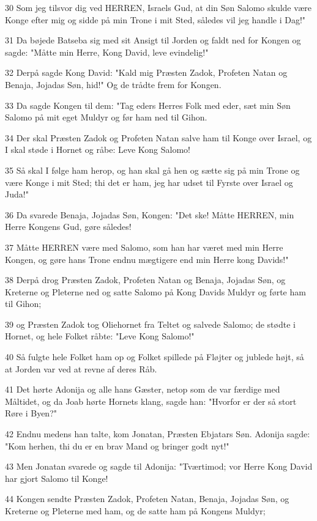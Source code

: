 \par 30 Som jeg tilsvor dig ved HERREN, Israels Gud, at din Søn Salomo skulde være Konge efter mig og sidde på min Trone i mit Sted, således vil jeg handle i Dag!"
\par 31 Da bøjede Batseba sig med sit Ansigt til Jorden og faldt ned for Kongen og sagde: "Måtte min Herre, Kong David, leve evindelig!"
\par 32 Derpå sagde Kong David: "Kald mig Præsten Zadok, Profeten Natan og Benaja, Jojadas Søn, hid!" Og de trådte frem for Kongen.
\par 33 Da sagde Kongen til dem: "Tag eders Herres Folk med eder, sæt min Søn Salomo på mit eget Muldyr og før ham ned til Gihon.
\par 34 Der skal Præsten Zadok og Profeten Natan salve ham til Konge over Israel, og I skal støde i Hornet og råbe: Leve Kong Salomo!
\par 35 Så skal I følge ham herop, og han skal gå hen og sætte sig på min Trone og være Konge i mit Sted; thi det er ham, jeg har udset til Fyrste over Israel og Juda!"
\par 36 Da svarede Benaja, Jojadas Søn, Kongen: "Det ske! Måtte HERREN, min Herre Kongens Gud, gøre således!
\par 37 Måtte HERREN være med Salomo, som han har været med min Herre Kongen, og gøre hans Trone endnu mægtigere end min Herre kong Davids!"
\par 38 Derpå drog Præsten Zadok, Profeten Natan og Benaja, Jojadas Søn, og Kreterne og Pleterne ned og satte Salomo på Kong Davids Muldyr og førte ham til Gihon;
\par 39 og Præsten Zadok tog Oliehornet fra Teltet og salvede Salomo; de stødte i Hornet, og hele Folket råbte: "Leve Kong Salomo!"
\par 40 Så fulgte hele Folket ham op og Folket spillede på Fløjter og jublede højt, så at Jorden var ved at revne af deres Råb.
\par 41 Det hørte Adonija og alle hans Gæster, netop som de var færdige med Måltidet, og da Joab hørte Hornets klang, sagde han: "Hvorfor er der så stort Røre i Byen?"
\par 42 Endnu medens han talte, kom Jonatan, Præsten Ebjatars Søn. Adonija sagde: "Kom herhen, thi du er en brav Mand og bringer godt nyt!"
\par 43 Men Jonatan svarede og sagde til Adonija: "Tværtimod; vor Herre Kong David har gjort Salomo til Konge!
\par 44 Kongen sendte Præsten Zadok, Profeten Natan, Benaja, Jojadas Søn, og Kreterne og Pleterne med ham, og de satte ham på Kongens Muldyr;
